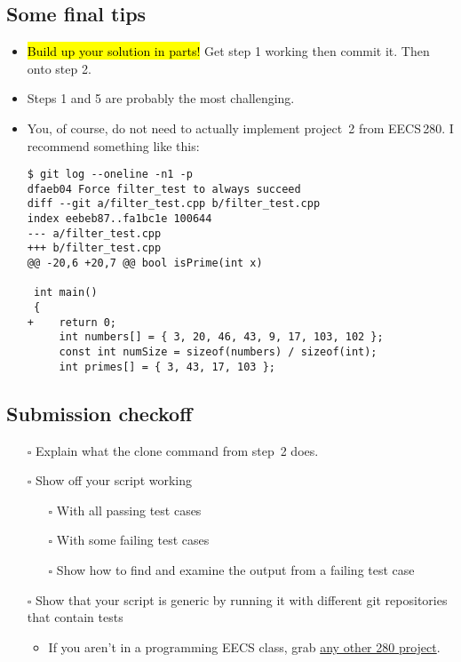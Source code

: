 \documentclass{article}
\begin{document}
\medskip
\noindent

\newpage

\subsection*{Some final tips}

\begin{itemize}
    \item \hl{Build up your solution in parts!} Get step 1 working then commit it.
    Then onto step 2.
  \item Steps 1 and 5 are probably the most challenging.
  \item You, of course, do not need to actually implement project~2 from
    EECS\,280.  I recommend something like this:%
\lstset{basicstyle=\footnotesize\ttfamily}
\begin{lstlisting}
$ git log --oneline -n1 -p
dfaeb04 Force filter_test to always succeed
diff --git a/filter_test.cpp b/filter_test.cpp
index eebeb87..fa1bc1e 100644
--- a/filter_test.cpp
+++ b/filter_test.cpp
@@ -20,6 +20,7 @@ bool isPrime(int x)

 int main()
 {
+    return 0;
     int numbers[] = { 3, 20, 46, 43, 9, 17, 103, 102 };
     const int numSize = sizeof(numbers) / sizeof(int);
     int primes[] = { 3, 43, 17, 103 };
\end{lstlisting}
\end{itemize}

\subsection*{Submission checkoff}
\begin{itemize}
  \item[$\square$] Explain what the clone command from step~2 does.
  \item[$\square$] Show off your script working
    \begin{itemize}
      \item[$\square$] With all passing test cases
      \item[$\square$] With some failing test cases
      \item[$\square$] Show how to find and examine the output from a failing
        test case
    \end{itemize}
  \item[$\square$] Show that your script is generic by running it with different
    git repositories that contain tests
    \begin{itemize}
      \item If you aren't in a programming EECS class, grab
        \href{https://eecs280staff.github.io/eecs280.org/}{any other 280
        project}.
    \end{itemize}
\end{itemize}
\end{document}
